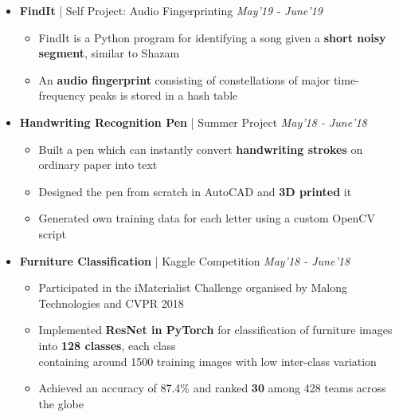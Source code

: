 \documentclass[10pt,letterpaper,sans]{moderncv}
\providecommand{\sl}{\slshape}
\begin{document}
\begin{itemize}
\begin{itemize}
\end{itemize}
\vspace{5pt}
\item \textbf{FindIt} | Self Project: Audio Fingerprinting \hfill{\sl May'19 - June'19}\\
\vspace{-10pt}
\begin{itemize}
\item FindIt is a Python program for identifying a song given a \textbf{short noisy segment}, similar to Shazam
\item An \textbf{audio fingerprint} consisting of constellations of major time-frequency peaks is stored in a hash table
\end{itemize}
\vspace{5pt}
\item \textbf{Handwriting Recognition Pen} | Summer Project \hfill{\sl May'18 - June'18}\\
\vspace{-10pt}
\begin{itemize}
\item Built a pen which can instantly convert \textbf{handwriting strokes} on ordinary paper into text
\item Designed the pen from scratch in AutoCAD and \textbf{3D printed} it
\item Generated own training data for each letter using a custom OpenCV script
\end{itemize}
\vspace{5pt}
\item \textbf{Furniture Classification} | Kaggle Competition \hfill{\sl May'18 - June'18}\\
\vspace{-10pt}
\begin{itemize}
\item Participated in the iMaterialist Challenge organised by Malong Technologies and CVPR 2018
\item Implemented \textbf{ResNet in PyTorch} for classification of furniture images into \textbf{128 classes}, each class \\ containing around 1500 training images with low inter-class variation
\item Achieved an accuracy of 87.4\% and ranked \textbf{30} among 428 teams across the globe
\end{itemize}

\end{itemize}
\vspace{-10pt}
\end{document}

